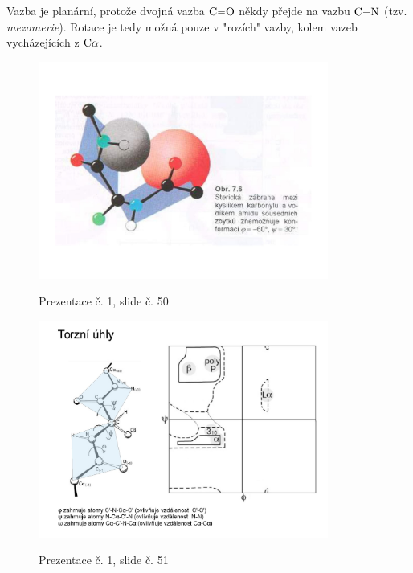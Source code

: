 \documentclass[DIV=8]{scrreprt}
\begin{document}
Vazba je planární, protože dvojná vazba \(\ce{C=O}\) někdy přejde na vazbu \(\ce{C-N}\) (tzv. \emph{mezomerie}). Rotace je tedy možná pouze v "rozích" vazby, kolem vazeb vycházejících z \(\ce{C\alpha}\).

\begin{figure}
    \caption{Prezentace č. 1, slide č. 50}
    \includegraphics[width=0.85\textwidth]{slides-1/slide-50.jpg}
    \centering
    \label{slides-1-slide-50}
\end{figure}
\begin{figure}
    \caption{Prezentace č. 1, slide č. 51}
    \includegraphics[width=0.85\textwidth]{slides-1/slide-51.jpg}
    \centering
    \label{slides-1-slide-51}
\end{figure}
\end{document}
